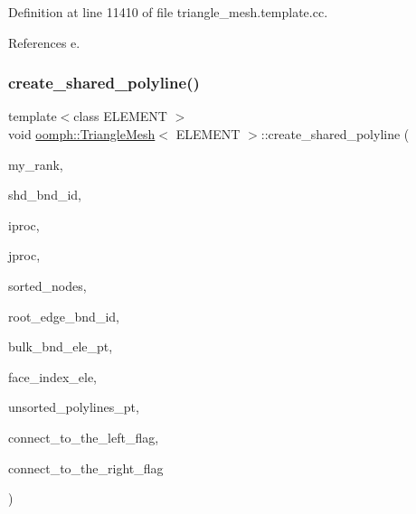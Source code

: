 Definition at line 11410 of file triangle\+\_\+mesh.\+template.\+cc.



References e.

\mbox{\label{classoomph_1_1TriangleMesh_ac59a791cf11147bc54b17a12a35e9707}} 
\subsubsection{\texorpdfstring{create\+\_\+shared\+\_\+polyline()}{create\_shared\_polyline()}}
{\footnotesize\ttfamily template$<$class E\+L\+E\+M\+E\+NT $>$ \\
void \hyperlink{classoomph_1_1TriangleMesh}{oomph\+::\+Triangle\+Mesh}$<$ E\+L\+E\+M\+E\+NT $>$\+::create\+\_\+shared\+\_\+polyline (\begin{DoxyParamCaption}\item[{const unsigned \&}]{my\+\_\+rank,  }\item[{const unsigned \&}]{shd\+\_\+bnd\+\_\+id,  }\item[{const unsigned \&}]{iproc,  }\item[{const unsigned \&}]{jproc,  }\item[{std\+::list$<$ \hyperlink{classoomph_1_1Node}{Node} $\ast$$>$ \&}]{sorted\+\_\+nodes,  }\item[{const int \&}]{root\+\_\+edge\+\_\+bnd\+\_\+id,  }\item[{\hyperlink{classoomph_1_1Vector}{Vector}$<$ \hyperlink{classoomph_1_1FiniteElement}{Finite\+Element} $\ast$$>$ \&}]{bulk\+\_\+bnd\+\_\+ele\+\_\+pt,  }\item[{\hyperlink{classoomph_1_1Vector}{Vector}$<$ int $>$ \&}]{face\+\_\+index\+\_\+ele,  }\item[{\hyperlink{classoomph_1_1Vector}{Vector}$<$ \hyperlink{classoomph_1_1Vector}{Vector}$<$ \hyperlink{classoomph_1_1TriangleMeshPolyLine}{Triangle\+Mesh\+Poly\+Line} $\ast$$>$ $>$ \&}]{unsorted\+\_\+polylines\+\_\+pt,  }\item[{const int \&}]{connect\+\_\+to\+\_\+the\+\_\+left\+\_\+flag,  }\item[{const int \&}]{connect\+\_\+to\+\_\+the\+\_\+right\+\_\+flag }\end{DoxyParamCaption})\hspace{0.3cm}{\ttfamily [protected]}}



